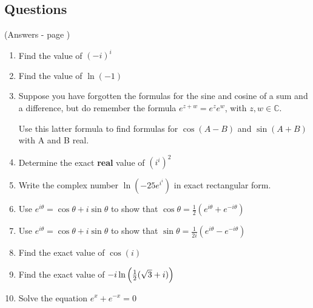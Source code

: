 \documentclass[../main.tex]{subfiles}
\begin{document}
\subsection*{Questions}
(Answers - page \pageref*{Eulers answers})
\label{eulersformula}
\begin{enumerate}
    \item 
    Find the value of \((-i)^i\)

    \item 
    Find the value of \(\ln{(-1)}\)

    \item 
    Suppose you have forgotten the formulas for the sine and cosine of a sum and a difference, but do remember the formula \(e^{z+w}=e^z e^w\), with \(z, w \in \mathbb{C} \).

    Use this latter formula to find formulas for \(\cos{(A-B)}\) and \(\sin{(A+B)}\) with A and B real.

    \item 
    Determine the exact \textbf{real} value of \((i^i)^{2}\)

    \item 
    Write the complex number \(\ln{(-25e^{i^{i}})}\) in exact rectangular form.

    \item 
    Use \(e^{i\theta}=\cos{\theta}+i\sin{\theta}\) to show that \(\cos{\theta}=\frac{1}{2}(e^{i\theta}+e^{-i\theta})\)

    \item 
    Use \(e^{i\theta}=\cos{\theta}+i\sin{\theta}\) to show that \(\sin{\theta}=\frac{1}{2i}(e^{i\theta}-e^{-i\theta})\)

    \item 
    Find the exact value of $\cos{(i)}$

    \item 
    Find the exact value of $-i\ln{\Bigl(\frac{1}{2}(\sqrt{3}+i)\Bigr)}$

    \item 
    Solve the equation $e^x+e^{-x}=0$
\end{enumerate}
\end{document}
